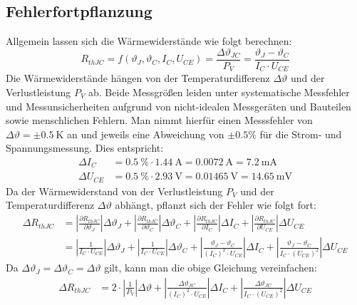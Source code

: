 \subsection{Fehlerfortpflanzung}
Allgemein lassen sich die Wärmewiderstände wie folgt berechnen:
\begin{equation*}
    R_{thJC} = f(\vartheta_J, \vartheta_C, I_C, U_{CE}) = \frac{\Delta \vartheta_{JC}}{P_V} = \frac{\vartheta_J - \vartheta_C}{I_C \cdot U_{CE}}
\end{equation*}
Die Wärmewiderstände hängen von der Temperaturdifferenz $\Delta \vartheta$ und der Verlustleistung $P_V$ ab. Beide Messgrößen leiden unter systematische Messfehler und Messunsicherheiten aufgrund von nicht-idealen Messgeräten und Bauteilen sowie menschlichen Fehlern.
Man nimmt hierfür einen Messsfehler von $\Delta \vartheta = \pm \SI{0.5}{\kelvin}$ an und jeweils eine Abweichung von $\pm 0.5\%$ für die Strom- und Spannungsmessung. Dies entspricht:
\begin{align*}
    \Delta I_C    & = \SI{0.5}{\percent} \cdot \SI{1.44}{\ampere} = \SI{0.0072}{\ampere} = \SI{7.2}{\milli\ampere} \\
    \Delta U_{CE} & = \SI{0.5}{\percent} \cdot \SI{2.93}{\volt} = \SI{0.01465}{\volt} = \SI{14.65}{\milli\volt}
\end{align*}
Da der Wärmewiderstand von der Verlustleistung $P_V$ und der Temperaturdifferenz $\Delta \vartheta$ abhängt, pflanzt sich der Fehler wie folgt fort:
\begin{align}
    \label{eqn:raw_fehlerfortpflanzung}
    \Delta R_{thJC} & = \left| \frac{\partial R_{thJC}}{\partial \vartheta_J} \right| \Delta \vartheta_J + \left| \frac{\partial R_{thJC}}{\partial \vartheta_C} \right| \Delta \vartheta_C + \left| \frac{\partial R_{thJC}}{\partial I_C} \right| \Delta I_C + \left| \frac{\partial R_{thJC}}{\partial U_{CE}} \right| \Delta U_{CE}  \\
                    & = \left| \frac{1}{I_C \cdot U_{CE}} \right| \Delta \vartheta_J + \left| \frac{1}{I_C \cdot U_{CE}} \right| \Delta \vartheta_C  + \left| \frac{\vartheta_J - \vartheta_C}{(I_C)^2 \cdot U_{CE}} \right| \Delta I_C  + \left| \frac{\vartheta_J - \vartheta_C}{I_C \cdot (U_{CE})^2} \right| \Delta U_{CE} \nonumber
\end{align}
Da $\Delta \vartheta_J = \Delta \vartheta_C = \Delta \vartheta$ gilt, kann man die obige Gleichung vereinfachen:
\begin{align}
    \Delta R_{thJC} & = 2 \cdot \left| \frac{1}{P_V} \right| \Delta \vartheta + \left| \frac{\Delta \vartheta_{JC}}{(I_C)^2 \cdot U_{CE}} \right| \Delta I_C + \left| \frac{\Delta \vartheta_{JC}}{I_C \cdot (U_{CE})^2} \right| \Delta U_{CE}
\end{align}
